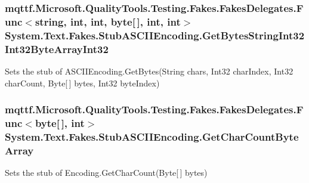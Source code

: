 \hypertarget{class_system_1_1_text_1_1_fakes_1_1_stub_a_s_c_i_i_encoding_aa3f7325074cc98a0c8a954b559a4bba7}{
\subsubsection[{Get\-Bytes\-String\-Int32\-Int32\-Byte\-Array\-Int32}]{\setlength{\rightskip}{0pt plus 5cm}mqttf.\-Microsoft.\-Quality\-Tools.\-Testing.\-Fakes.\-Fakes\-Delegates.\-Func$<$string, int, int, byte\mbox{[}$\,$\mbox{]}, int, int$>$ System.\-Text.\-Fakes.\-Stub\-A\-S\-C\-I\-I\-Encoding.\-Get\-Bytes\-String\-Int32\-Int32\-Byte\-Array\-Int32}}\label{class_system_1_1_text_1_1_fakes_1_1_stub_a_s_c_i_i_encoding_aa3f7325074cc98a0c8a954b559a4bba7}


Sets the stub of A\-S\-C\-I\-I\-Encoding.\-Get\-Bytes(\-String chars, Int32 char\-Index, Int32 char\-Count, Byte\mbox{[}$\,$\mbox{]} bytes, Int32 byte\-Index)

\hypertarget{class_system_1_1_text_1_1_fakes_1_1_stub_a_s_c_i_i_encoding_ad910ff830f6a6e2d0463732c63811c65}{
\subsubsection[{Get\-Char\-Count\-Byte\-Array}]{\setlength{\rightskip}{0pt plus 5cm}mqttf.\-Microsoft.\-Quality\-Tools.\-Testing.\-Fakes.\-Fakes\-Delegates.\-Func$<$byte\mbox{[}$\,$\mbox{]}, int$>$ System.\-Text.\-Fakes.\-Stub\-A\-S\-C\-I\-I\-Encoding.\-Get\-Char\-Count\-Byte\-Array}}\label{class_system_1_1_text_1_1_fakes_1_1_stub_a_s_c_i_i_encoding_ad910ff830f6a6e2d0463732c63811c65}


Sets the stub of Encoding.\-Get\-Char\-Count(\-Byte\mbox{[}$\,$\mbox{]} bytes)

